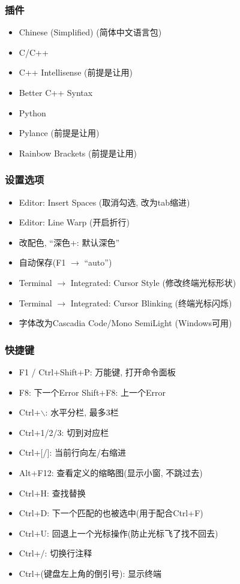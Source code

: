 \subsubsection{插件}

\begin{itemize}
	\item Chinese (Simplified) (简体中文语言包)
	\item C/C++
	\item C++ Intellisense (前提是让用)
	\item Better C++ Syntax
	\item Python
	\item Pylance (前提是让用)
	\item Rainbow Brackets (前提是让用)
\end{itemize}

\subsubsection{设置选项}

\begin{itemize}
	\item Editor: Insert Spaces (取消勾选, 改为tab缩进)
	\item Editor: Line Warp (开启折行)
	\item 改配色, ``深色+: 默认深色''
	\item 自动保存(F1 $\rightarrow$ ``auto'')
	\item Terminal $\to$ Integrated: Cursor Style (修改终端光标形状)
	\item Terminal $\to$ Integrated: Cursor Blinking (终端光标闪烁)
	\item 字体改为Cascadia Code/Mono SemiLight (Windows可用)
\end{itemize}

\subsubsection{快捷键}

\begin{itemize}
	\item F1 / Ctrl+Shift+P: 万能键, 打开命令面板
	\item F8: 下一个Error \quad Shift+F8: 上一个Error
	\item Ctrl+$\backslash$: 水平分栏, 最多3栏
	\item Ctrl+1/2/3: 切到对应栏
	\item Ctrl+[/]: 当前行向左/右缩进
	\item Alt+F12: 查看定义的缩略图(显示小窗, 不跳过去)
	\item Ctrl+H: 查找替换
	\item Ctrl+D: 下一个匹配的也被选中(用于配合Ctrl+F)
	\item Ctrl+U: 回退上一个光标操作(防止光标飞了找不回去)
	\item Ctrl+/: 切换行注释
	\item Ctrl+(键盘左上角的倒引号): 显示终端
\end{itemize}
